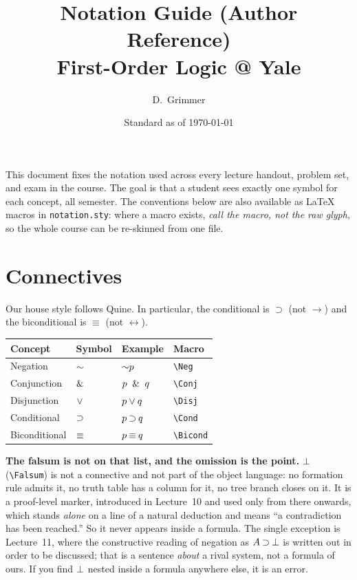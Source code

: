 \documentclass[11pt]{article}
\title{Notation Guide (Author Reference)\\\large First-Order Logic @ Yale}
\author{D.\ Grimmer}
\date{Standard as of \today}
\begin{document}
\maketitle

\noindent
This document fixes the notation used across every lecture handout, problem set, and exam in the course. The goal is that a student sees exactly one symbol for each concept, all semester. The conventions below are also available as LaTeX macros in \texttt{notation.sty}: where a macro exists, \emph{call the macro, not the raw glyph}, so the whole course can be re-skinned from one file.

\section{Connectives}

Our house style follows Quine. In particular, the conditional is $\supset$ (not $\to$) and the biconditional is $\equiv$ (not $\leftrightarrow$).

\begin{center}
\begin{tabular}{@{}llll@{}}
\toprule
Concept & Symbol & Example & Macro \\
\midrule
Negation        & $\mathord{\sim}$     & $\mathord{\sim} p$           & \verb|\Neg| \\
Conjunction     & $\mathbin{\&}$    & $p \ \mathbin{\&} \  q$        & \verb|\Conj| \\
Disjunction     & $\mathbin{\vee}$    & $p \mathbin{\vee} q$        & \verb|\Disj| \\
Conditional     & $\mathbin{\supset}$    & $p \mathbin{\supset} q$        & \verb|\Cond| \\
Biconditional   & $\mathbin{\equiv}$  & $p \mathbin{\equiv} q$      & \verb|\Bicond| \\
\bottomrule
\end{tabular}
\end{center}

\noindent
\textbf{The falsum is not on that list, and the omission is the point.} $\bot$ (\verb|\Falsum|) is not a connective and not part of the object language: no formation rule admits it, no truth table has a column for it, no tree branch closes on it. It is a proof-level marker, introduced in Lecture~10 and used only from there onwards, which stands \emph{alone} on a line of a natural deduction and means ``a contradiction has been reached.'' So it never appears inside a formula. The single exception is Lecture~11, where the constructive reading of negation as $A \mathbin{\supset} \bot$ is written out in order to be discussed; that is a sentence \emph{about} a rival system, not a formula of ours. If you find $\bot$ nested inside a formula anywhere else, it is an error.
\end{document}

